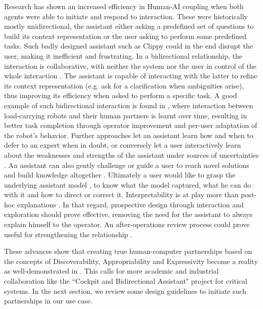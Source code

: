 \documentclass{IOS-Book-Article}
\begin{document}
Research \cite{horvitz1999principles}  has shown an increased efficiency in Human-AI coupling when both agents were able to initiate and respond to interaction. These were historically mostly unidirectional, the assistant either asking a predefined set of questions to build its context representation or the user asking to perform some predefined tasks. Such badly designed assistant such as Clippy \cite{baym2019intelligent} could in the end disrupt the user, making it inefficient and frustrating.
In a bidirectional relationship, the interaction is collaborative, with neither the system nor the user in control of the whole interaction \cite{heer2019agency}. The assistant is capable of interacting with the latter to refine its context representation (e.g. ask for a clarification when ambiguities arise), thus improving its efficiency when asked to perform a specific task. A good example of such bidirectional interaction is found in \cite{blanchet:hal-03113458}, where interaction between load-carrying robots and their human partners is learnt over time, resulting in better task completion through operator improvement and per-user adaptation of the robot's behavior.
Further approaches let an assistant learn how and when to defer to an expert \cite{mozannar2020consistent} when in doubt, or conversely let a user interactively learn about the weaknesses and strengths of the assistant under sources of uncertainties \cite{sanchez2022deep}. An assistant can also gently challenge or guide a user to reach novel solutions and build knowledge altogether \cite{liu2017bignav,malloch2017fieldward}. Ultimately a user would like to grasp the underlying assistant model \cite{conversy2018vizir}, to know what the model captured, what he can do with it and how to direct or correct it. Interpretability is at play more than post-hoc explanations \cite{rudin2018please}. In that regard, prospective design \cite{shneiderman2022human,hull2003everything} through interaction and exploration should prove effective, removing the need for the assistant to always explain himself to the operator. An after-operations review process could prove useful for strengthening the relationship \cite{dodge2021after}.

These advances show that creating true human-computer partnerships \cite{beaudouin2021generative} based on the concepts of Discoverability, Appropriability and Expressivity become a reality as well-demonstrated in \cite{koch2020imagesense}. This calls for more academic and industrial collaboration like the ``Cockpit and Bidirectional Assistant" project \cite{cab_project} for critical systems.
In the next section, we review some design guidelines to initiate such partnerships in our use case. 
\end{document}
